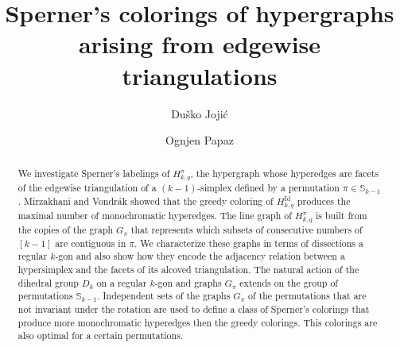 \documentclass{birkjour}
\theoremstyle{definition}
\theoremstyle{remark}
\numberwithin{equation}{section}
\begin{document}
%
%
%
%
%
%
%
%
%
\begin{abstract}
We investigate Sperner's labelings of $H^\pi_{k,q}$, the
hypergraph whose hyperedges are facets of the edgewise
triangulation of a $(k-1)$-simplex defined by a permutation
$\pi\in \mathbb{S}_{k-1}$. Mirzakhani and Vondr\' ak showed that
the greedy coloring of $H^{\mathrm{Id}}_{k,q}$ produces the
maximal number of monochromatic hyperedges. The line graph of
$H_{k,q}^\pi$ is built from the copies of the graph $G_\pi$ that
represents which subsets of consecutive numbers of $[k-1]$ are
contiguous in $\pi$. We characterize these graphs in terms of
dissections a regular $k$-gon and also show how they encode the
adjacency relation between a hypersimplex and the facets of its
alcoved triangulation. The natural action of the dihedral group
$D_k$ on a regular $k$-gon and graphs $G_\pi$ extends on the group
of permutations $\mathbb S_{k-1}$. Independent sets of the graphs
$G_\pi$ of the permutations that are not invariant under the
rotation are used to define a class of Sperner's colorings that
produce more monochromatic hyperedges then the greedy colorings.
This colorings are also optimal for a certain permutations.

\end{abstract}

\title[]
 {Sperner's colorings of hypergraphs
arising from edgewise triangulations}



\author[Du\v sko Joji\' c]{Du\v sko Joji\' c}

\address{%
University of Banja Luka, Faculty of Science\\
Mladena Stojanovi\' ca 2, 78 000 Banja Luka\\
Bosnia and Herzegovina}

\author[Ognjen Papaz]{Ognjen Papaz}

\address{%
University of East Sarajevo, Faculty of Philosophy\\
Alekse \v Santi\'ca 1, 71 420 Pale\\
Bosnia and Herzegovina}
\end{document}
